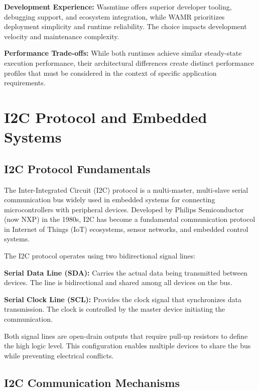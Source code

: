 \textbf{Development Experience:}
Wasmtime offers superior developer tooling, debugging support, and ecosystem integration, while WAMR prioritizes deployment simplicity and runtime reliability. The choice impacts development velocity and maintenance complexity.

\textbf{Performance Trade-offs:}
While both runtimes achieve similar steady-state execution performance, their architectural differences create distinct performance profiles that must be considered in the context of specific application requirements.

\section{I2C Protocol and Embedded Systems}
\label{sec:i2c-embedded}

\subsection{I2C Protocol Fundamentals}
\label{subsec:i2c-fundamentals}

The Inter-Integrated Circuit (I2C) protocol is a multi-master, multi-slave serial communication bus widely used in embedded systems for connecting microcontrollers with peripheral devices\cite{i2c_specification}. Developed by Philips Semiconductor (now NXP) in the 1980s, I2C has become a fundamental communication protocol in Internet of Things (IoT) ecosystems, sensor networks, and embedded control systems.


The I2C protocol operates using two bidirectional signal lines:

\textbf{Serial Data Line (SDA):} Carries the actual data being transmitted between devices. The line is bidirectional and shared among all devices on the bus.

\textbf{Serial Clock Line (SCL):} Provides the clock signal that synchronizes data transmission. The clock is controlled by the master device initiating the communication.

Both signal lines are open-drain outputs that require pull-up resistors to define the high logic level. This configuration enables multiple devices to share the bus while preventing electrical conflicts.

\subsection{I2C Communication Mechanisms}
\label{subsec:i2c-communication}

